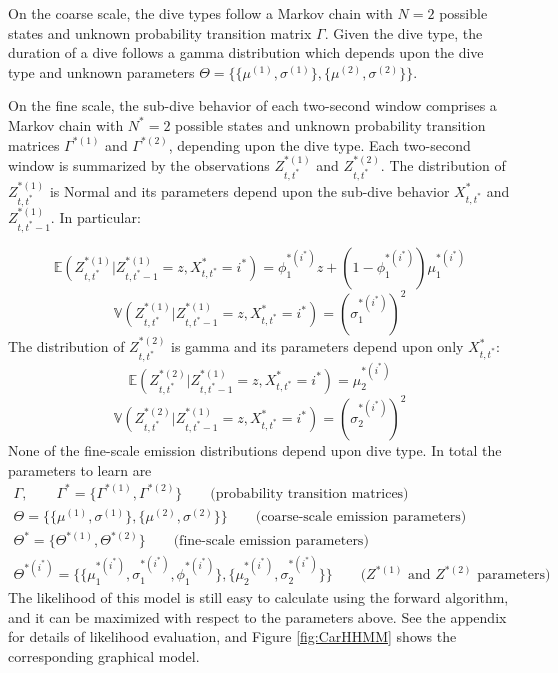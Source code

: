 On the coarse scale, the dive types follow a Markov chain with $N=2$ possible states and unknown probability transition matrix $\Gamma$. Given the dive type, the duration of a dive follows a gamma distribution which depends upon the dive type and unknown parameters $\Theta = \{\{\mu^{(1)},\sigma^{(1)}\},\{\mu^{(2)},\sigma^{(2)}\}\}$.

On the fine scale, the sub-dive behavior of each two-second window comprises a Markov chain with $N^*=2$ possible states and unknown probability transition matrices $\Gamma^{*(1)}$ and $\Gamma^{*(2)}$, depending upon the dive type. Each two-second window is summarized by the observations $Z^{*(1)}_{t,t^*}$ and $Z^{*(2)}_{t,t^*}$. The distribution of $Z^{*(1)}_{t,t^*}$ is Normal and its parameters depend upon the sub-dive behavior $X^*_{t,t^*}$ and $Z^{*(1)}_{t,t^*-1}$. In particular:

$$\mathbb{E}(Z^{*(1)}_{t,t^*}|Z^{*(1)}_{t,t^*-1} = z,X^*_{t,t^*} = i^*) = \phi_1^{*(i^*)}z + (1-\phi_1^{*(i^*)}) \mu_1^{*(i^*)}$$
$$\mathbb{V}(Z^{*(1)}_{t,t^*}|Z^{*(1)}_{t,t^*-1} = z,X^*_{t,t^*} = i^*) = \left(\sigma_1^{*(i^*)}\right)^2$$
%
The distribution of $Z^{*(2)}_{t,t^*}$ is gamma and its parameters depend upon only $X^*_{t,t^*}$:
%
$$\mathbb{E}(Z^{*(2)}_{t,t^*}|Z^{*(1)}_{t,t^*-1} = z,X^*_{t,t^*} = i^*) = \mu_2^{*(i^*)}$$
$$\mathbb{V}(Z^{*(2)}_{t,t^*}|Z^{*(1)}_{t,t^*-1} = z,X^*_{t,t^*} = i^*) = (\sigma_2^{*(i^*)})^2$$
%
None of the fine-scale emission distributions depend upon dive type. In total the parameters to learn are
%
\begin{gather*}
    \Gamma, \qquad \Gamma^{*} = \{\Gamma^{*(1)},\Gamma^{*(2)}\} \qquad \text{(probability transition matrices)} \\
    \Theta = \{\{\mu^{(1)},\sigma^{(1)}\},\{\mu^{(2)},\sigma^{(2)}\}\} \qquad \text{(coarse-scale emission parameters)} \\
    \Theta^* = \{\Theta^{*(1)},\Theta^{*(2)}\}  \qquad \text{(fine-scale emission parameters)} \\
    \Theta^{*(i^*)} =  \{\{\mu_1^{*(i^*)},\sigma_1^{*(i^*)},\phi_1^{*(i^*)}\},\{\mu_2^{*(i^*)},\sigma_2^{*(i^*)}\}\} \qquad \text{(}Z^{*(1)} \text{ and } Z^{*(2)} \text{ parameters)}
\end{gather*}
%
The likelihood of this model is still easy to calculate using the forward algorithm, and it can be maximized with respect to the parameters above. See the appendix for details of likelihood evaluation, and Figure \ref{fig:CarHHMM} shows the corresponding graphical model.

